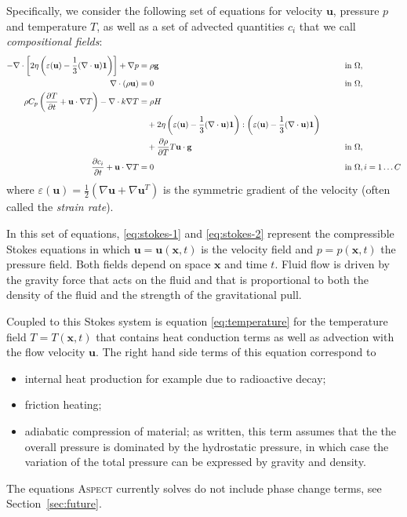 \documentclass{article}
\newcommand{\aspect}{\textsc{Aspect}}
\begin{document}
Specifically, we consider the following set of equations for velocity $\mathbf
u$, pressure $p$ and temperature $T$, as well as a set of advected quantities
$c_i$ that we call \textit{compositional fields}:
\begin{align}
  \label{eq:stokes-1}
  -\nabla \cdot \left[2\eta \left(\varepsilon(\mathbf u)
                                  - \frac{1}{3}(\nabla \cdot \mathbf u)\mathbf 1\right)
                \right] + \nabla p &=
  \rho \mathbf g
  & \qquad
  & \textrm{in $\Omega$},
  \\
  \label{eq:stokes-2}
  \nabla \cdot (\rho \mathbf u) &= 0
  & \qquad
  & \textrm{in $\Omega$},
  \\
  \label{eq:temperature}
  \rho C_p \left(\frac{\partial T}{\partial t} + \mathbf u\cdot\nabla T\right)
  - \nabla\cdot k\nabla T
  &=
  \rho H
  \notag
  \\
  &\quad
  +
  2\eta
  \left(\varepsilon(\mathbf u) - \frac{1}{3}(\nabla \cdot \mathbf u)\mathbf 1\right)
  :
  \left(\varepsilon(\mathbf u) - \frac{1}{3}(\nabla \cdot \mathbf u)\mathbf 1\right)
  \\
  &\quad
  +\frac{\partial \rho}{\partial T} T \mathbf u \cdot \mathbf g
  & \quad
  & \textrm{in $\Omega$},
  \notag
  \\
  \label{eq:compositional}
  \frac{\partial c_i}{\partial t} + \mathbf u\cdot\nabla T
  &=
  0
  & \quad
  & \textrm{in $\Omega$},
  i=1\ldots C
\end{align}
where $\varepsilon(\mathbf u) = \frac{1}{2}(\nabla \mathbf u + \nabla\mathbf
u^T)$ is the symmetric gradient of the velocity (often called the
\textit{strain rate}).

In this set of equations, \eqref{eq:stokes-1} and \eqref{eq:stokes-2}
represent the compressible Stokes equations in which $\mathbf u=\mathbf
u(\mathbf x,t)$ is the velocity field and $p=p(\mathbf x,t)$ the pressure
field. Both fields depend on space $\mathbf x$ and time $t$. Fluid flow is
driven by the gravity force that acts on the fluid and that is proportional to
both the density of the fluid and the strength of the gravitational pull.

Coupled to this Stokes system is equation \eqref{eq:temperature} for the
temperature field $T=T(\mathbf x,t)$ that contains heat conduction terms as
well as advection with the flow velocity $\mathbf u$. The right hand side
terms of this equation correspond to
\begin{itemize}
\item internal heat production for example due to radioactive
  decay;
\item friction heating;
\item adiabatic compression of material; as written, this term assumes that
  the the overall pressure is dominated by the hydrostatic pressure, in which
  case the variation of the total pressure can be expressed by gravity and
  density.
\end{itemize}
The equations \aspect{} currently solves do not include phase change terms,
see Section~\ref{sec:future}.
\end{document}
